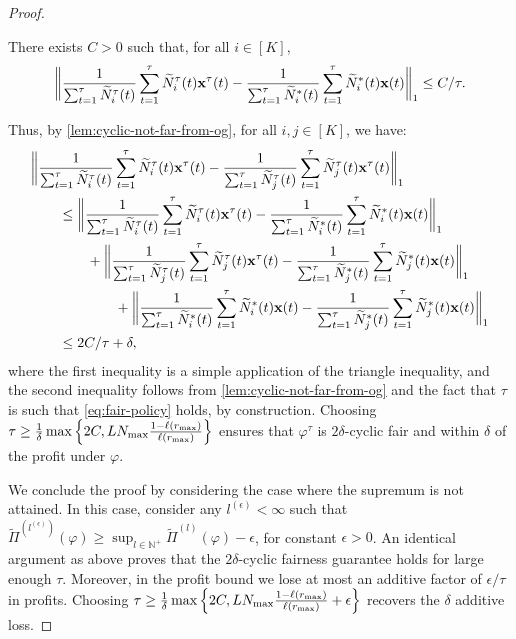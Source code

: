\documentclass[12pt]{article}
\begin{document}
\begin{proof}
\begin{lemma}\label{lem:cyclic-not-far-from-og}
There exists $C > 0$ such that, for all $i \in [K]$,
\begin{align*}
\bigg{\lVert}\frac{1}{\sum_{t=1}^{\tau}\widetilde{N}^\tau_i(t)}\sum_{t=1}^{\tau} \widetilde{N}^\tau_i(t)\mathbf{x}^\tau(t) - \frac{1}{\sum_{t=1}^{\tau}\widetilde{N}^*_i(t)}\sum_{t=1}^{\tau} \widetilde{N}^*_i(t)\mathbf{x}(t) \bigg{\rVert}_1 \leq C/\tau.
\end{align*}
\end{lemma}



Thus, by \cref{lem:cyclic-not-far-from-og}, for all $i, j \in [K]$, we have:
\begin{align*}
&\bigg{\lVert}\frac{1}{\sum_{t=1}^{\tau}\widetilde{N}^\tau_i(t)}\sum_{t=1}^{\tau} \widetilde{N}^\tau_i(t)\mathbf{x}^\tau(t) - \frac{1}{\sum_{t=1}^{\tau}\widetilde{N}^\tau_j(t)}\sum_{t=1}^{\tau} \widetilde{N}^\tau_j(t)\mathbf{x}^\tau(t) \bigg{\rVert}_1  \\  &\qquad \leq \bigg{\lVert}\frac{1}{\sum_{t=1}^{\tau}\widetilde{N}^\tau_i(t)}\sum_{t=1}^{\tau} \widetilde{N}^\tau_i(t)\mathbf{x}^\tau(t) - \frac{1}{\sum_{t=1}^{\tau}\widetilde{N}^*_i(t)}\sum_{t=1}^{\tau} \widetilde{N}^*_i(t)\mathbf{x}(t) \bigg{\rVert}_1 \\
&\qquad \qquad + \bigg{\lVert}\frac{1}{\sum_{t=1}^{\tau}\widetilde{N}^\tau_j(t)}\sum_{t=1}^{\tau} \widetilde{N}^\tau_j(t)\mathbf{x}^\tau(t) - \frac{1}{\sum_{t=1}^{\tau}\widetilde{N}^*_j(t)}\sum_{t=1}^{\tau} \widetilde{N}^*_j(t)\mathbf{x}(t) \bigg{\rVert}_1 \\
&\qquad \qquad \qquad + \bigg{\lVert}\frac{1}{\sum_{t=1}^{\tau}\widetilde{N}^*_i(t)}\sum_{t=1}^{\tau} \widetilde{N}^*_i(t)\mathbf{x}(t) - \frac{1}{\sum_{t=1}^{\tau}\widetilde{N}^*_j(t)}\sum_{t=1}^{\tau} \widetilde{N}^*_j(t)\mathbf{x}(t) \bigg{\rVert}_1 \\
&\qquad \leq 2C/\tau + \delta,
\end{align*}
where the first inequality is a simple application of the triangle inequality, and the second inequality follows from \cref{lem:cyclic-not-far-from-og} and the fact that $\tau$ is such that \ref{eq:fair-policy} holds, by construction. Choosing $\tau \geq \frac1\delta \max\left\{2C,L N_{\max}\frac{1-\ell({r_{\max}})}{\ell(r_{\max})}\right\}$ ensures that $\varphi^\tau$ is $2\delta$-cyclic fair and within $\delta$ of the profit under $\varphi$.


We conclude the proof by considering the case where the supremum is not attained. In this case, consider any $l^{(\epsilon)} < \infty$ such that $\widetilde{\Pi}^{(l^{(\epsilon)})}(\varphi) \geq \sup_{l \in \mathbb{N}^+}\widetilde{\Pi}^{(l)}(\varphi) - \epsilon$, for constant $\epsilon > 0$. An identical argument as above proves that the $2\delta$-cyclic fairness guarantee holds for large enough $\tau$. Moreover, in the profit bound we lose at most an additive factor of $\epsilon/\tau$ in profits. Choosing $\tau \geq \frac1\delta \max\left\{2C, L N_{\max}\frac{1-\ell({r_{\max}})}{\ell(r_{\max})} + \epsilon\right\}$ recovers the $\delta$ additive loss.
\end{proof}
\end{document}
